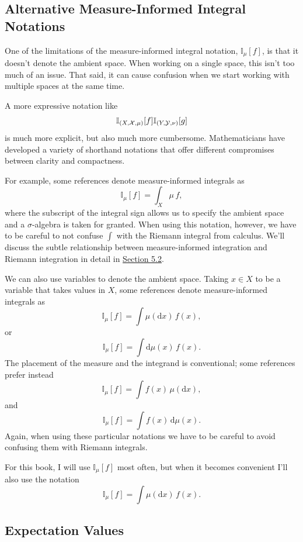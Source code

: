 \documentclass[
  letterpaper,
  DIV=11,
  numbers=noendperiod]{scrartcl}
\begin{document}
\subsection{Alternative Measure-Informed Integral
Notations}\label{sec:alt_notations}

One of the limitations of the measure-informed integral notation,
\(\mathbb{I}_{\mu}[f]\), is that it doesn't denote the ambient space.
When working on a single space, this isn't too much of an issue. That
said, it can cause confusion when we start working with multiple spaces
at the same time.

A more expressive notation like \[
\mathbb{I}_{(X, \mathcal{X}, \mu)}[f]
\\
\mathbb{I}_{(Y, \mathcal{Y}, \nu)}[g]
\] is much more explicit, but also much more cumbersome. Mathematicians
have developed a variety of shorthand notations that offer different
compromises between clarity and compactness.

For example, some references denote measure-informed integrals as \[
\mathbb{I}_{\mu}[f] = \int_{X} \mu \, f,
\] where the subscript of the integral sign allows us to specify the
ambient space and a \(\sigma\)-algebra is taken for granted. When using
this notation, however, we have to be careful to not confuse \(\int\)
with the Riemann integral from calculus. We'll discuss the subtle
relationship between measure-informed integration and Riemann
integration in detail in \hyperref[sec:integration_on_R]{Section 5.2}.

We can also use variables to denote the ambient space. Taking
\(x \in X\) to be a variable that takes values in \(X\), some references
denote measure-informed integrals as \[
\mathbb{I}_{\mu}[f] = \int \mu(\mathrm{d} x) \, f(x),
\] or \[
\mathbb{I}_{\mu}[f] = \int \mathrm{d} \mu(x) \, f(x).
\] The placement of the measure and the integrand is conventional; some
references prefer instead \[
\mathbb{I}_{\mu}[f] = \int f(x) \, \mu(\mathrm{d} x),
\] and \[
\mathbb{I}_{\mu}[f] = \int f(x) \, \mathrm{d} \mu(x).
\] Again, when using these particular notations we have to be careful to
avoid confusing them with Riemann integrals.

For this book, I will use \(\mathbb{I}_{\mu}[f]\) most often, but when
it becomes convenient I'll also use the notation \[
\mathbb{I}_{\mu}[f] = \int \mu(\mathrm{d} x) \, f(x).
\]

\subsection{Expectation Values}\label{expectation-values}
\end{document}
